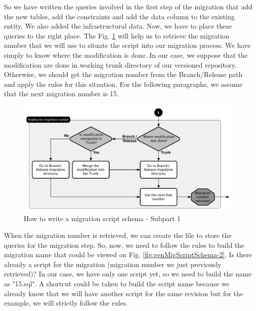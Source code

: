 So we have written the queries involved in the first step of the migration that add the new tables, add the constraints and add the data column to the existing entity. We also added the infrastructural data. Now, we have to place these queries to the right place. The Fig. \ref{fig:genMigScriptSchema-1} will help us to retrieve the migration number that we will use to situate the script into our migration process. We have simply to know where the modification is done. In our case, we suppose that the modification are done in working trunk directory of our versioned repository. Otherwise, we should get the migration number from the Branch/Release path and apply the rules for this situation. For the following paragraphs, we assume that the next migration number is 15.

\begin{figure}[h]
        \centering
        \includegraphics[scale=0.60]{images/mig-schema-gen-1.pdf}
        \caption{How to write a migration script schema - Subpart 1}
        \label{fig:genMigScriptSchema-1}
\end{figure}

When the migration number is retrieved, we can create the file to store the queries for the migration step. So, now, we need to follow the rules to build the migration name that could be viewed on Fig. \ref{fig:genMigScriptSchema-2}. Is there already a script for the migration (migration number we just previously retrieved)? In our case, we have only one script yet, so we need to build the name as "15.sql". A shortcut could be taken to build the script name because we already know that we will have another script for the same revision but for the example, we will strictly follow the rules.

